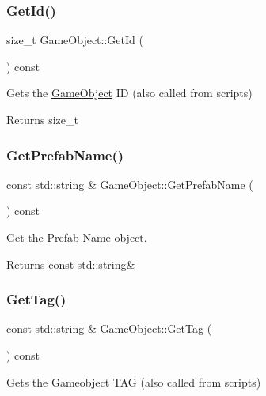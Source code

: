\subsubsection{\texorpdfstring{Get\+Id()}{GetId()}}
{\footnotesize\ttfamily size\+\_\+t Game\+Object\+::\+Get\+Id (\begin{DoxyParamCaption}{ }\end{DoxyParamCaption}) const}



Gets the \hyperlink{classGameObject}{Game\+Object} ID (also called from scripts) 

\begin{DoxyReturn}{Returns}
size\+\_\+t 
\end{DoxyReturn}
\mbox{\label{classGameObject_a6f4378b0219e78cf1852e224ca6545b5}} 
\subsubsection{\texorpdfstring{Get\+Prefab\+Name()}{GetPrefabName()}}
{\footnotesize\ttfamily const std\+::string \& Game\+Object\+::\+Get\+Prefab\+Name (\begin{DoxyParamCaption}{ }\end{DoxyParamCaption}) const}



Get the Prefab Name object. 

\begin{DoxyReturn}{Returns}
const std\+::string\& 
\end{DoxyReturn}
\mbox{\label{classGameObject_a6ec65a8b875cfcf7d9155390579fcaab}} 
\subsubsection{\texorpdfstring{Get\+Tag()}{GetTag()}}
{\footnotesize\ttfamily const std\+::string \& Game\+Object\+::\+Get\+Tag (\begin{DoxyParamCaption}{ }\end{DoxyParamCaption}) const}



Gets the Gameobject T\+AG (also called from scripts) 


